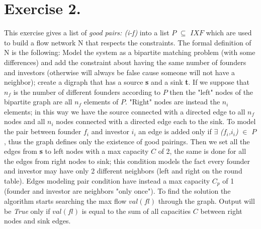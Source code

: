 \documentclass[11pt]{scrartcl}
\begin{document}
\newpage

\section*{Exercise 2.} This exercise gives a list of \textit{good pairs: (i-f)} into a list $P$ $\subseteq$ $I X F$  which are used to build a flow network N that respects the constraints. The formal definition of N is the following: Model the system as a bipartite matching problem (with some differences) and add the constraint about having the same number of founders and investors (otherwise will always be false cause someone will not have a neighbor); create a digraph that has a source \textbf{s} and a sink \textbf{t}. If we suppose that $n_f$ is the number of different founders according to $P$ then the "left" nodes of the bipartite graph are all $n_f$ elements of $P$. "Right" nodes are instead the $n_i$ elements; in this way we have the source connected with a directed edge to all $n_f$ nodes and all $n_i$ nodes connected with a directed edge each to the sink. To model the pair between founder $f_i$ and investor $i_i$ an edge is added only if $\exists$ \textit{($f_i$,$i_i$)} $\in$ $P$, thus the graph defines only the existence of good pairings. Then we set all the edges from \textbf{s} to left nodes with a max capacity $C$ of 2, the same is done for all the edges from right nodes to sink; this condition models the fact every founder and investor may have only 2 different neighbors (left and right on the round table). Edges modeling pair condition have instead a max capacity $C_p$ of 1 (founder and investor are neighbors "only once"). To find the solution the algorithm starts searching the max flow $val(fl)$ through the graph. Output will be \textit{True} only if $val(fl)$ is equal to the sum of all capacities $C$ between right nodes and sink edges. \newline
\end{document}
